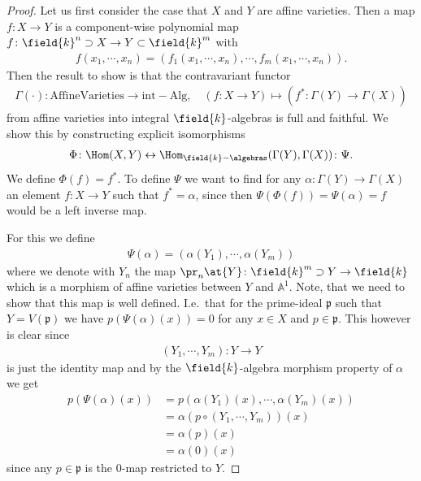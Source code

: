 \begin{proof}
Let us first consider the case that $X$ and $Y$ are affine
varieties. Then a map $f\colon X \rightarrow Y$ is a component-wise
polynomial map $f\colon \field{k}^{n}\supset X \rightarrow Y \subset
\field{k}^m$ with
\begin{align*}
  f(x_1,\cdots, x_n) = \left( f_1(x_1,\cdots, x_n) , \cdots , f_m(x_1,\cdots, x_n) \right).
\end{align*}
Then the result to show is that the contravariant functor
\begin{align*}
  \Gamma (\cdot ) \colon \mathrm{AffineVarieties}
  \rightarrow \mathrm{int-Alg}, \quad (f\colon X\rightarrow Y )\mapsto
  (f^* \colon \Gamma(Y)\rightarrow \Gamma(X))
\end{align*}
from affine varieties into integral $\field{k}$-algebras is full and
faithful. We show this by constructing explicit isomorphisms
\begin{align*}
  \Phi\colon \Hom(X,Y) \leftrightarrow
  \Hom_{\field{k}-\algebras}(\Gamma(Y),\Gamma(X)) \colon \Psi.
\end{align*}
We define $\Phi (f) = f^*$. To define $\Psi$ we want to find for any
$\alpha \colon \Gamma(Y) \rightarrow \Gamma(X)$ an element $f\colon
X\rightarrow Y$ such that $f^*= \alpha$, since then $\Psi (\Phi
(f)) = \Psi (\alpha) = f$ would be a left inverse map.

For this we define
\begin{align*}
  \Psi ( \alpha )= \left(  \alpha (Y_1) , \cdots, \alpha(Y_m) \right)
\end{align*}
where we denote with $Y_n$ the map $\pr_n\at{Y} \colon \field{k}^m\supset Y
\rightarrow \field{k}$ which is a morphism of affine varieties between
$Y$ and $\mathbb{A}^1$.
Note, that we need to show that this map is well defined. I.e.\ that
for the prime-ideal $\mathfrak{p}$ such that $Y=V(\mathfrak{p})$ we
have $p(\Psi (\alpha)(x))=0$ for any $x\in X$ and $p\in \mathfrak{p}$.
This however is clear since
\begin{align*}
  \left(Y_1, \cdots ,Y_m \right) \colon Y \rightarrow Y
\end{align*}
is just the identity map and by the $\field{k}$-algebra morphism
property of $\alpha$ we get
\begin{align*}
  p(\Psi (\alpha)(x)) &= p\left( \alpha(Y_1)(x), \cdots
                        ,\alpha(Y_m)(x) \right) \\
                      &= \alpha \left(  p\circ (Y_1 ,\cdots ,Y_m)
                        \right)(x)\\
                      &= \alpha ( p ) (x)\\
                      &=\alpha (0)(x)
\end{align*}
since any $p\in \mathfrak{p}$ is the $0$-map restricted to $Y$.


\end{proof}
